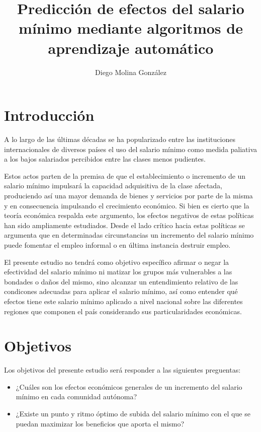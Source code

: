 \documentclass[11pt]{article}
\providecommand{\tightlist}{%
      \setlength{\itemsep}{0pt}\setlength{\parskip}{0pt}}
\begin{document}
    \title{\fontsize{14pt}{14pt}\selectfont Predicción de efectos del salario mínimo mediante algoritmos de aprendizaje automático}
    \author{Diego Molina González}
    \date{}
    \maketitle

    \section{Introducción}\label{introduccion}

    A lo largo de las últimas décadas se ha popularizado entre las
instituciones internacionales de diversos países el uso del salario
mínimo como medida paliativa a los bajos salariados percibidos entre las
clases menos pudientes.

Estos actos parten de la premisa de que el establecimiento o incremento
de un salario mínimo impulsará la capacidad adquisitiva de la clase
afectada, produciendo así una mayor demanda de bienes y servicios por
parte de la misma y en consecuencia impulsando el crecimiento económico.
Si bien es cierto que la teoría económica respalda este argumento, los
efectos negativos de estas políticas han sido ampliamente estudiados.
Desde el lado crítico hacia estas políticas se argumenta que en
determinadas circunstancias un incremento del salario mínimo puede
fomentar el empleo informal o en última instancia destruir empleo.

El presente estudio no tendrá como objetivo específico afirmar o negar
la efectividad del salario mínimo ni matizar los grupos más vulnerables
a las bondades o daños del mismo, sino alcanzar un entendimiento
relativo de las condicones adecuadas para aplicar el salario mínimo, así
como entender qué efectos tiene este salario mínimo aplicado a nivel
nacional sobre las diferentes regiones que componen el país considerando
sus particularidades económicas.

    \section{Objetivos}

    Los objetivos del presente estudio será responder a las siguientes
preguentas:

\begin{itemize}
\tightlist
\item
  ¿Cuáles son los efectos económicos generales de un incremento del
  salario mínimo en cada comunidad autónoma?
\item
  ¿Existe un punto y ritmo óptimo de subida del salario mínimo con el
  que se puedan maximizar los beneficios que aporta el mismo?
\end{itemize}
\end{document}
